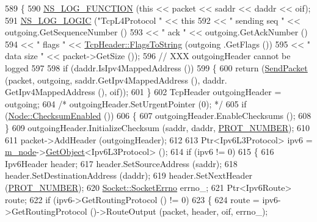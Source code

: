 \begin{DoxyCode}
589 \{
590   \hyperlink{log-macros-disabled_8h_a90b90d5bad1f39cb1b64923ea94c0761}{NS\_LOG\_FUNCTION} (\textcolor{keyword}{this} << packet << saddr << daddr << oif);
591   \hyperlink{group__logging_ga88acd260151caf2db9c0fc84997f45ce}{NS\_LOG\_LOGIC} (\textcolor{stringliteral}{"TcpL4Protocol "} << \textcolor{keyword}{this}
592                                  << \textcolor{stringliteral}{" sending seq "} << outgoing.GetSequenceNumber ()
593                                  << \textcolor{stringliteral}{" ack "} << outgoing.GetAckNumber ()
594                                  << \textcolor{stringliteral}{" flags "} << \hyperlink{classns3_1_1TcpHeader_aaaa261ca12b0fb50e45c7083cec88cff}{TcpHeader::FlagsToString} (outgoing
      .GetFlags ())
595                                  << \textcolor{stringliteral}{" data size "} << packet->GetSize ());
596   \textcolor{comment}{// XXX outgoingHeader cannot be logged}
597 
598   \textcolor{keywordflow}{if} (daddr.IsIpv4MappedAddress ())
599     \{
600       \textcolor{keywordflow}{return} (\hyperlink{classns3_1_1TcpL4Protocol_a622217854cad6fdfd562f42a6731ba6c}{SendPacket} (packet, outgoing, saddr.GetIpv4MappedAddress (), daddr.
      GetIpv4MappedAddress (), oif));
601     \}
602   TcpHeader outgoingHeader = outgoing;
604   \textcolor{comment}{/* outgoingHeader.SetUrgentPointer (0); */}
605   \textcolor{keywordflow}{if} (\hyperlink{classns3_1_1Node_a0515bfe9a3aeb6605d657ba855699815}{Node::ChecksumEnabled} ())
606     \{
607       outgoingHeader.EnableChecksums ();
608     \}
609   outgoingHeader.InitializeChecksum (saddr, daddr, \hyperlink{classns3_1_1TcpL4Protocol_ac6c1cee44ae21227e755678bb52dbc89}{PROT\_NUMBER});
610 
611   packet->AddHeader (outgoingHeader);
612 
613   Ptr<Ipv6L3Protocol> ipv6 = \hyperlink{classns3_1_1TcpL4Protocol_a89e39fd5367f8ce22565f69e224de189}{m\_node}->\hyperlink{classns3_1_1Object_a13e18c00017096c8381eb651d5bd0783}{GetObject}<Ipv6L3Protocol> ();
614   \textcolor{keywordflow}{if} (ipv6 != 0)
615     \{
616       Ipv6Header header;
617       header.SetSourceAddress (saddr);
618       header.SetDestinationAddress (daddr);
619       header.SetNextHeader (\hyperlink{classns3_1_1TcpL4Protocol_ac6c1cee44ae21227e755678bb52dbc89}{PROT\_NUMBER});
620       \hyperlink{classns3_1_1Socket_ada1328c5ae0c28cb2a982caf8f6d6cca}{Socket::SocketErrno} errno\_;
621       Ptr<Ipv6Route> route;
622       \textcolor{keywordflow}{if} (ipv6->GetRoutingProtocol () != 0)
623         \{
624           route = ipv6->GetRoutingProtocol ()->RouteOutput (packet, header, oif, errno\_);

\end{DoxyCode}
